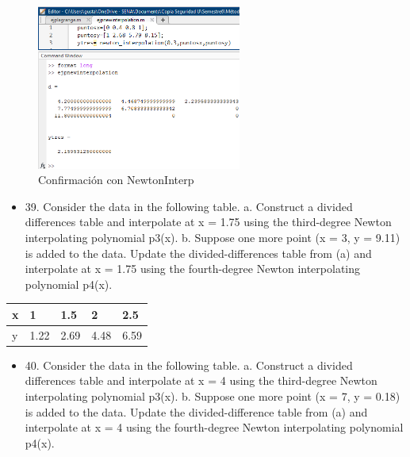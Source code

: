 \documentclass{article}
\begin{document}
\begin{figure}[H]
    \centering
    \includegraphics[width=0.6\textwidth]{38.png}
    \caption{Confirmación con NewtonInterp}
\end{figure}


\begin{itemize}
    \item 39. Consider the data in the following table.
          \newline  a. Construct a divided differences table and interpolate at x = 1.75
          using the third-degree Newton interpolating polynomial p3(x).
          \newline  b. Suppose one more point (x = 3, y = 9.11) is added to the data.
          Update the divided-differences table from (a) and interpolate at
          x = 1.75 using the fourth-degree Newton interpolating polynomial
          p4(x).
\end{itemize}

\begin{table}[h!]
    \begin{tabular}{l|l|l|l|l}
        \hline
        \multicolumn{1}{|p{30.865313pt}}{\raggedright x} & \multicolumn{1}{|p{30.865313pt}}{\raggedright 1}    & \multicolumn{1}{|p{32.370937pt}}{\raggedright 1.5}  & \multicolumn{1}{|p{30.1125pt}}{\raggedright 2}    & \multicolumn{1}{|p{30.1125pt}|}{\raggedright 2.5}  \\
        \hline
        \multicolumn{1}{|p{30.865313pt}}{\raggedright y} & \multicolumn{1}{|p{30.865313pt}}{\raggedright 1.22} & \multicolumn{1}{|p{32.370937pt}}{\raggedright 2.69} & \multicolumn{1}{|p{30.1125pt}}{\raggedright 4.48} & \multicolumn{1}{|p{30.1125pt}|}{\raggedright 6.59} \\
        \hline
    \end{tabular}
\end{table}

\begin{itemize}
    \item 40. Consider the data in the following table.
          \newline  a. Construct a divided differences table and interpolate at x = 4
          using the third-degree Newton interpolating polynomial p3(x).
          \newline  b. Suppose one more point (x = 7, y = 0.18) is added to the data.
          Update the divided-difference table from (a) and interpolate at
          x = 4 using the fourth-degree Newton interpolating polynomial
          p4(x).
\end{itemize}
\end{document}
